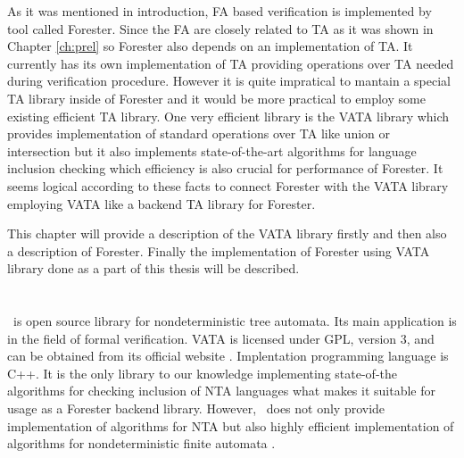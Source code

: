 As it was mentioned in introduction, FA based verification is implemented by tool
called Forester.
Since the FA are closely related to TA as it was shown in Chapter \ref{ch:prel} so
Forester also depends on an implementation of TA.
It currently has its own implementation of TA providing operations over TA needed during verification procedure.
However it is quite impratical to mantain a special TA library inside of Forester
and it would be more practical to employ some existing efficient TA library.
One very efficient library is the VATA library which provides implementation of standard operations over TA like union or intersection
but it also implements state-of-the-art algorithms \cite{tacas11} for language inclusion checking which efficiency
is also crucial for performance of Forester.
It seems logical according to these facts to connect Forester with the VATA library employing VATA like a backend TA library for Forester.

This chapter will provide a description of the VATA library firstly and then also a description of Forester.
Finally the implementation of Forester using VATA library done as a part of this thesis will be described.

\section{\vata}
\label{sec:VATA}

\vata\ is open source library for nondeterministic tree automata.
Its main application is in the field of formal verification.
VATA is licensed under GPL, version 3, and can be obtained from its official website \cite{www:vata}.
Implentation programming language is C++.
It is the only library to our knowledge implementing state-of-the algorithms for checking inclusion of NTA languages
what makes it suitable for usage as a Forester backend library.
However, \vata\ does not only provide implementation of algorithms for NTA but also highly efficient implementation of
algorithms for nondeterministic finite automata \cite{hruska13}.

